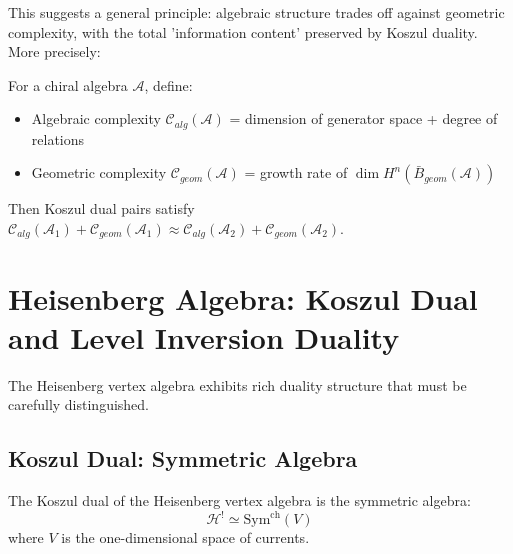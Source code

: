 This suggests a general principle: algebraic structure trades off against geometric complexity, with the total 'information content' preserved by Koszul duality. More precisely:

\begin{conjecture}
For a chiral algebra $\mathcal{A}$, define:
\begin{itemize}
\item Algebraic complexity $\mathcal{C}_{alg}(\mathcal{A})$ = dimension of generator space + degree of relations
\item Geometric complexity $\mathcal{C}_{geom}(\mathcal{A})$ = growth rate of $\dim H^n(\bar{B}_{geom}(\mathcal{A}))$
\end{itemize}
Then Koszul dual pairs satisfy $\mathcal{C}_{alg}(\mathcal{A}_1) + \mathcal{C}_{geom}(\mathcal{A}_1) \approx \mathcal{C}_{alg}(\mathcal{A}_2) + \mathcal{C}_{geom}(\mathcal{A}_2)$.
\end{conjecture}


\section{Heisenberg Algebra: Koszul Dual and Level Inversion Duality}

The Heisenberg vertex algebra exhibits rich duality structure that must be carefully distinguished.

\subsection{Koszul Dual: Symmetric Algebra}

\begin{theorem}\label{thm:heisenberg-koszul-correct}
The Koszul dual of the Heisenberg vertex algebra is the symmetric algebra:
$$\mathcal{H}^! \simeq \text{Sym}^{\text{ch}}(V)$$
where $V$ is the one-dimensional space of currents.
\end{theorem}

